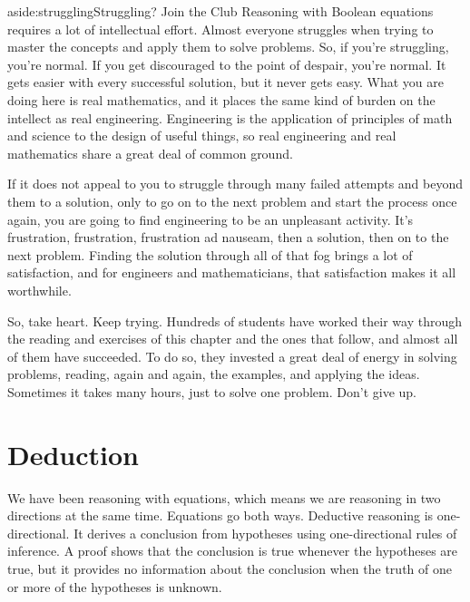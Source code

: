 \begin{aside}{aside:struggling}{Struggling? Join the Club}
Reasoning with Boolean equations requires a lot of intellectual effort.
Almost everyone struggles when trying to master the concepts
and apply them to solve problems.
So, if you're struggling, you're normal.
If you get discouraged to the point of despair, you're normal.
It gets easier with every successful solution, but it never gets easy.
What you are doing here is real mathematics, and it places the same
kind of burden on the intellect as real engineering.
Engineering is the application of principles
of math and science to the design of useful things,
so real engineering and real mathematics share a great deal of common ground.

If it does not appeal to you to struggle through many
failed attempts and beyond them to a solution, only to
go on to the next problem and start the process once again,
you are going to find engineering to be an unpleasant activity.
It's frustration, frustration, frustration
ad nauseam, then a solution, then on to the next problem.
Finding the solution through all of that fog
brings a lot of satisfaction, and for engineers and mathematicians,
that satisfaction makes it all worthwhile.

So, take heart. Keep trying.
Hundreds of students have worked their way through the reading
and exercises of this chapter and the ones that follow,
and almost all of them have succeeded.
To do so, they invested a great deal of energy in solving problems,
reading, again and again, the examples, and applying the ideas.
Sometimes it takes many hours, just to solve one problem.
Don't give up.
\end{aside}

\section{Deduction}
\label{sec:deduction}

We have been reasoning with equations,
which means we are reasoning in two directions
at the same time. Equations go both ways.
Deductive reasoning is one-directional.
It derives a conclusion from hypotheses using one-directional rules of inference.
A proof shows that the conclusion is true whenever the hypotheses are true, but it provides
no information about the conclusion when the truth of one or more of the hypotheses is
unknown.

